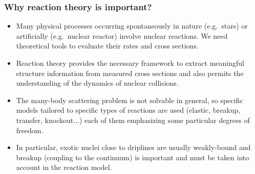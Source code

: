 \documentclass[english,10pt]{beamer}
\newcommand{\slide}[1]{\begin{frame} \frametitle{ #1}}
\begin{document}
\slide{}
\begin{center}
\end{center} 
\end{frame}


\slide{Why reaction theory is important?}

\begin{itemize}
\setlength{\itemsep}{14pt}

\item Many physical processes occurring spontaneously in nature (e.g.~stars) or artificially (e.g.~nuclear reactor) involve nuclear reactions. We need theoretical tools to evaluate their rates and cross sections. 

\item Reaction theory provides the necessary framework to extract meaningful {\blue structure} information from measured {\blue cross sections} and also permits the understanding of the {\blue dynamics} of nuclear collisions.


\item The many-body scattering problem is not solvable in general,  so specific models tailored to specific types of reactions are used ({\blue elastic}, {\blue breakup}, {\blue transfer}, {\blue knockout}...)
each of them emphasizing some particular degrees of freedom. 

\item In particular,  exotic nuclei close to driplines are usually weakly-bound and {\blue breakup}  (coupling to the continuum) is  important and must be  taken into account in the reaction model. 




\end{itemize}

\end{frame}
\end{document}
